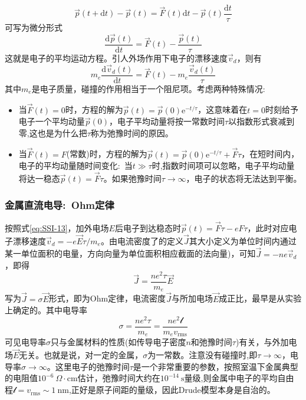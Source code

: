 \begin{equation}
	\vec p(t+\mathrm{d}t)-\vec p(t)=\vec F(t)\mathrm{d}t-\vec p(t)\dfrac{\mathrm{d}t}{\tau}
	\label{eq:Drude-electron_movement-2}
\end{equation} 
可写为微分形式
\begin{equation}
	\dfrac{\mathrm{d}\vec p(t)}{\mathrm{d}t}=\vec F(t)-\dfrac{\vec p(t)}{\tau}
	\label{eq:Drude-electron_movement-3}
\end{equation} 
这就是电子的平均运动方程。引人外场作用下电子的漂移速度$\vec v_d$，则有
\begin{equation}
	m_e\dfrac{\mathrm{d}\vec v_d(t)}{\mathrm{d}t}=\vec F(t)-m_e\dfrac{\vec v_d(t)}{\tau}
	\label{eq:SSI-13}
\end{equation} 
其中$m_e$是电子质量，碰撞的作用相当于一个阻尼项。考虑两种特殊情况:
\begin{itemize}
	\item 当$\vec F(t)=0$时，方程的解为$\vec p(t)=\vec p(0)\mathrm{e}^{-t/\tau}$，这意味着在$t=0$时刻给予电子一个平均动量$\vec p(0)$，电子平均动量将按一常数时间$\tau$以指数形式衰减到零,这也是为什么把$\tau$称为弛豫时间的原因。
	\item 当$\vec F(t)=F$(常数)时，方程的解为$\vec p(t)=\vec p(0)\mathrm{e}^{-t/\tau}+\vec F\tau$，在短时间内，电子的平均动量随时间变化:~当$t\gg\tau$时,指数时间项可以忽略，电子平均动量将达一稳态$\vec p(t)=\vec F\tau$。如果弛豫时间$\tau\rightarrow\infty$，电子的状态将无法达到平衡。
\end{itemize}

\subsubsection{金属直流电导:~Ohm定律} 
按照式\eqref{eq:SSI-13}，加外电场$E$后电子到达稳态时$\vec p(t)=\vec F\tau-eF\tau$，此时对应电子漂移速度$\vec v_d=-e\vec E\tau/m_e$。由电流密度了的定义$\vec J$其大小定义为单位时间内通过某一单位面积的电量，方向向量为单位面积相应截面的法向量)，可知$\vec J=-ne\vec v_d$，即得
\begin{equation}
	\vec J=\dfrac{ne^2\tau}{m_e}\vec E
	\label{eq:Electron_current}
\end{equation} 
写为$\vec J=\sigma\vec E$形式，即为Ohm定律，电流密度$\vec J$与所加电场$\vec E$成正比，最早是从实验上确定的。其中电导率
\begin{equation}
	\sigma=\dfrac{ne^2\tau}{m_e}=\dfrac{ne^2\mathscr{l}}{m_ev_{\mathrm{rms}}}
	\label{eq:Electron_conduct}
\end{equation} 
可见电导率$\sigma$只与金属材料的性质(如传导电子密度$n$和弛豫时间$\tau$)有关，与外加电场$\vec E$无关。也就是说，对一定的金属，$\sigma$为一常数。注意没有碰撞时,即$\tau\rightarrow\infty$，电导率$\sigma\rightarrow\infty$。这里电子的弛豫时间$\tau$是一个非常重要的参数，按照室温下金属典型的电阻值$10^{-6}~\Omega\cdot\mathrm{cm}$估计，弛豫时间大约在$10^{-14}~\mathrm{s}$量级,则金属中电子的平均自由程$\mathscr{l}=v_{\mathrm{rms}}\sim1~\mathrm{nm}$,正好是原子间距的量级，因此Drude模型本身是自治的。

